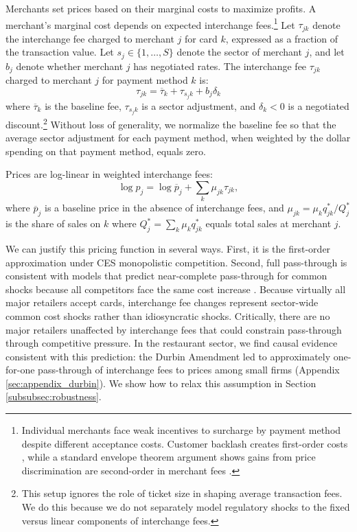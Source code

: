 \documentclass[main.tex]{subfiles}
\begin{document}
Merchants set prices based on their marginal costs to maximize profits.
A merchant's marginal cost depends on expected interchange fees.\footnote{Individual merchants face weak incentives to surcharge by payment method despite different acceptance costs.
Customer backlash creates first-order costs \citep{Stavins2018,Caddy.etal2020}, while a standard envelope theorem argument shows gains from price discrimination are second-order in merchant fees \citep{Wang2025}.}
Let $\tau_{jk}$ denote the interchange fee charged to merchant $j$ for card $k$, expressed as a fraction of the transaction value.
Let $s_j\in\{1,\ldots,S\}$ denote the sector of merchant $j$, and let $b_j$ denote whether merchant $j$ has negotiated rates.
The interchange fee $\tau_{jk}$ charged to merchant $j$ for payment method $k$ is:
\begin{equation}
\tau_{jk}=\overline{\tau}_{k}+\tau_{s_{j}k}+b_{j}\delta_{k}\label{eq:interchange-fee-model}
\end{equation}
where $\overline{\tau}_{k}$ is the baseline fee, $\tau_{s_{j}k}$ is a sector adjustment, and $\delta_{k}<0$ is a negotiated discount.\footnote{This setup ignores the role of ticket size in shaping average transaction fees. We do this because we do not separately model regulatory shocks to the fixed versus linear components of interchange fees.}
Without loss of generality, we normalize the baseline fee so that the average sector adjustment for each payment method, when weighted by the dollar spending on that payment method, equals zero.

Prices are log-linear in weighted interchange fees:
\begin{equation}
\log p_{j}=\log\overline{p}_{j}+\sum_{k}\mu_{jk}\tau_{jk},\label{eq:retail-price-pass}
\end{equation}
where $\overline{p}_j$ is a baseline price in the absence of interchange fees, and $\mu_{jk}=\mu_k q_{jk}^{*}/Q_{j}^{*}$ is the share of sales on $k$ where $Q_{j}^{*}=\sum_{k}\mu_k q_{jk}^{*}$ equals total sales at merchant $j$.

We can justify this pricing function in several ways.
First, it is the first-order approximation under CES monopolistic competition.
Second, full pass-through is consistent with models that predict near-complete pass-through for common shocks because all competitors face the same cost increase \citep{Amiti.etal2019}.
Because virtually all major retailers accept cards, interchange fee changes represent sector-wide common cost shocks rather than idiosyncratic shocks.
Critically, there are no major retailers unaffected by interchange fees that could constrain pass-through through competitive pressure.
In the restaurant sector, we find causal evidence consistent with this prediction: the Durbin Amendment led to approximately one-for-one pass-through of interchange fees to prices among small firms (Appendix \ref{sec:appendix_durbin}).
We show how to relax this assumption in Section \ref{subsubsec:robustness}.
\end{document}
